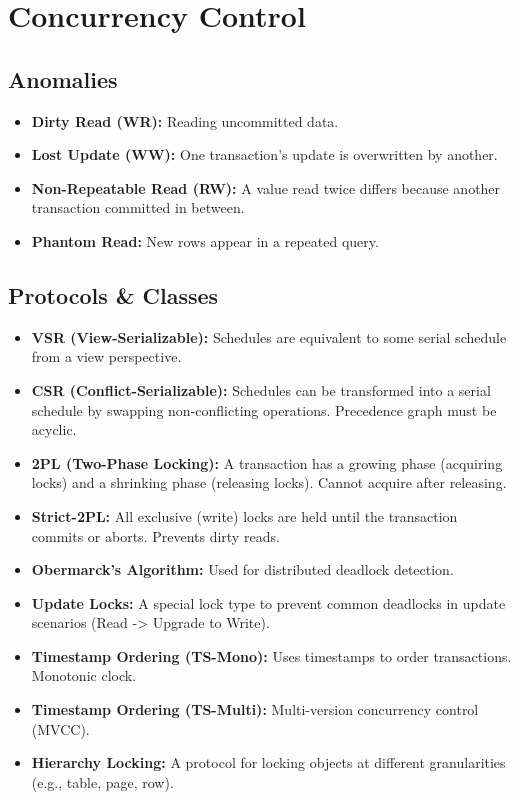 
\section*{Concurrency Control}

\subsection*{Anomalies}
\begin{itemize}
    \item \textbf{Dirty Read (WR):} Reading uncommitted data.
    \item \textbf{Lost Update (WW):} One transaction's update is overwritten by another.
    \item \textbf{Non-Repeatable Read (RW):} A value read twice differs because another transaction committed in between.
    \item \textbf{Phantom Read:} New rows appear in a repeated query.
\end{itemize}

\subsection*{Protocols \& Classes}
\begin{itemize}
    \item \textbf{VSR (View-Serializable):} Schedules are equivalent to some serial schedule from a view perspective.
    \item \textbf{CSR (Conflict-Serializable):} Schedules can be transformed into a serial schedule by swapping non-conflicting operations. Precedence graph must be acyclic.
    \item \textbf{2PL (Two-Phase Locking):} A transaction has a growing phase (acquiring locks) and a shrinking phase (releasing locks). Cannot acquire after releasing.
    \item \textbf{Strict-2PL:} All exclusive (write) locks are held until the transaction commits or aborts. Prevents dirty reads.
    \item \textbf{Obermarck's Algorithm:} Used for distributed deadlock detection.
    \item \textbf{Update Locks:} A special lock type to prevent common deadlocks in update scenarios (Read -> Upgrade to Write).
    \item \textbf{Timestamp Ordering (TS-Mono):} Uses timestamps to order transactions. Monotonic clock.
    \item \textbf{Timestamp Ordering (TS-Multi):} Multi-version concurrency control (MVCC).
    \item \textbf{Hierarchy Locking:} A protocol for locking objects at different granularities (e.g., table, page, row).
\end{itemize}
